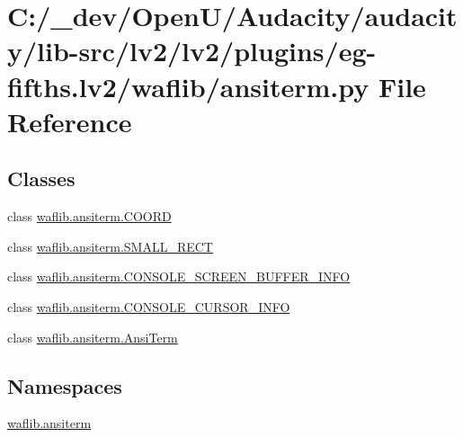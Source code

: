 \hypertarget{lv2_2plugins_2eg-fifths_8lv2_2waflib_2ansiterm_8py}{}\section{C\+:/\+\_\+dev/\+Open\+U/\+Audacity/audacity/lib-\/src/lv2/lv2/plugins/eg-\/fifths.lv2/waflib/ansiterm.py File Reference}
\label{lv2_2plugins_2eg-fifths_8lv2_2waflib_2ansiterm_8py}
\subsection*{Classes}
\begin{DoxyCompactItemize}
\item 
class \hyperlink{classwaflib_1_1ansiterm_1_1_c_o_o_r_d}{waflib.\+ansiterm.\+C\+O\+O\+RD}
\item 
class \hyperlink{classwaflib_1_1ansiterm_1_1_s_m_a_l_l___r_e_c_t}{waflib.\+ansiterm.\+S\+M\+A\+L\+L\+\_\+\+R\+E\+CT}
\item 
class \hyperlink{classwaflib_1_1ansiterm_1_1_c_o_n_s_o_l_e___s_c_r_e_e_n___b_u_f_f_e_r___i_n_f_o}{waflib.\+ansiterm.\+C\+O\+N\+S\+O\+L\+E\+\_\+\+S\+C\+R\+E\+E\+N\+\_\+\+B\+U\+F\+F\+E\+R\+\_\+\+I\+N\+FO}
\item 
class \hyperlink{classwaflib_1_1ansiterm_1_1_c_o_n_s_o_l_e___c_u_r_s_o_r___i_n_f_o}{waflib.\+ansiterm.\+C\+O\+N\+S\+O\+L\+E\+\_\+\+C\+U\+R\+S\+O\+R\+\_\+\+I\+N\+FO}
\item 
class \hyperlink{classwaflib_1_1ansiterm_1_1_ansi_term}{waflib.\+ansiterm.\+Ansi\+Term}
\end{DoxyCompactItemize}
\subsection*{Namespaces}
\begin{DoxyCompactItemize}
\item 
 \hyperlink{namespacewaflib_1_1ansiterm}{waflib.\+ansiterm}
\end{DoxyCompactItemize}
